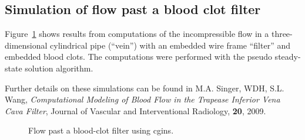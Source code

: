 \subsection{Simulation of flow past a blood clot filter}\label{sec:bloodFlow}

Figure~\ref{fig:bloodFlow} shows results from computations of the incompressible
flow in a three-dimensional cylindrical pipe (``vein'') with an embedded wire frame ``filter'' and 
embedded blood clots. 
The computations were performed with the pseudo steady-state solution algorithm. 

Further details on these simulations can be found in 
M.A. Singer, WDH, S.L. Wang, {\em Computational Modeling of Blood Flow in the Trapease Inferior Vena Cava Filter},
       Journal of Vascular and Interventional Radiology, {\bf 20}, 2009.

{
\newcommand{\figWidthp}{7.5cm}
\newcommand{\trimfig}[2]{\trimPlotb{#1}{#2}{.0}{.0}{.0}{.0}}
\newcommand{\figWidtha}{7.5cm}
\newcommand{\trimfiga}[2]{\trimPlotb{#1}{#2}{.0}{.35}{.0}{.0}}
\newcommand{\figWidthb}{4.5cm}
\newcommand{\trimfigb}[2]{\trimPlotb{#1}{#2}{.940}{.03}{.09}{.09}}
\begin{figure}[hbt]
\begin{center}
\end{center}
 \caption{Flow past a blood-clot filter using cgins.}\label{fig:bloodFlow}
\end{figure}
}



